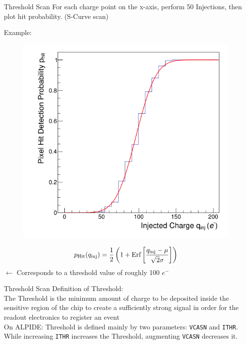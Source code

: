 \documentclass{beamer}
\begin{document}
\begin{frame}{Threshold Scan}
    For each charge point on the x-axis, perform 50 Injections, then plot hit
    probability. (S-Curve scan)\\[.5cm]
    \begin{minipage}{.49\textwidth}
	\centering
	Example:
	\begin{figure}[H]
	    \centering
	    \includegraphics[width=\textwidth]{s-curve.png}
	\end{figure}
    \end{minipage}
    \begin{minipage}{.49\textwidth}
	\[ 
	   p _{\text{Hit}} (q _{\text{inj}}) = \frac{1}{2} \left(
	       1 + \text{Erf} \left[ \frac{q _{\text{inj}} - \mu}{\sqrt{2} \sigma} 
	       \right] \right) \\[1cm]
       \]
       \tiny \( \leftarrow \) Corresponds to a threshold value of
	roughly 100 \( e ^{-} \) 
    \end{minipage}
\end{frame}

\begin{frame}[fragile]{Threshold Scan}
    \LARGE Definition of Threshold: \\[.5cm] \normalsize
    The Threshold is the minimum amount of charge to be deposited inside the
    sensitive region of the chip to create a sufficiently strong signal in
    order for the readout electronics to register an event \\[1cm]
    On ALPIDE: Threshold is defined mainly by two parameters: \verb`VCASN` and
    \verb`ITHR`. While increasing \verb`ITHR` increases the Threshold,
    augmenting \verb`VCASN` decreases it.
\end{frame}
\end{document}
